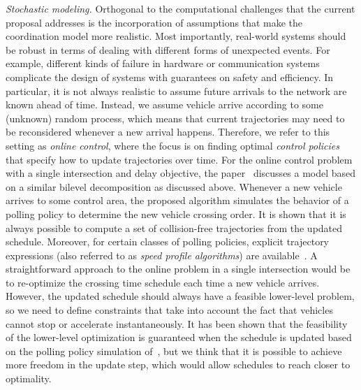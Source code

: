 \documentclass{article}
\theoremstyle{definition}
\theoremstyle{plain}
\begin{document}
\vspace{0.5em}\noindent
\textit{Stochastic modeling.}
Orthogonal to the computational challenges that the current proposal addresses
is the incorporation of assumptions that make the coordination model more
realistic. Most importantly, real-world systems should be robust in terms of
dealing with different forms of unexpected events. For example, different kinds
of failure in hardware or communication systems complicate the design of systems
with guarantees on safety and efficiency.
%
In particular, it is not always realistic to assume future arrivals to the network are known
ahead of time. Instead, we assume vehicle arrive according to some (unknown)
random process, which means that current trajectories may need to be
reconsidered whenever a new arrival happens. Therefore, we refer to this setting
as \textit{online control}, where the focus is on finding optimal \textit{control policies} that
specify how to update trajectories over time.
%
For the online control problem with a single intersection and delay objective,
the paper~\cite{miculescuPollingsystemsbasedAutonomousVehicle2016} discusses a
model based on a similar bilevel decomposition as discussed above. Whenever a
new vehicle arrives to some control area, the proposed algorithm simulates the
behavior of a polling policy to determine the new vehicle crossing order. It is
shown that it is always possible to compute a set of collision-free trajectories
from the updated schedule. Moreover, for certain classes of polling policies,
explicit trajectory expressions (also referred to as \textit{speed profile
  algorithms}) are available~\cite{timmermanPlatoonFormingAlgorithms2021}.
A straightforward approach to the online problem in a single intersection would
be to re-optimize the crossing time schedule each time a new vehicle arrives.
However, the updated schedule should always have a feasible lower-level problem,
so we need to define constraints that take into account the fact that vehicles
cannot stop or accelerate instantaneously. It has been shown that the
feasibility of the lower-level optimization is guaranteed when the schedule is
updated based on the polling policy simulation
of~\cite{miculescuPollingsystemsbasedAutonomousVehicle2016}, but we think that
it is possible to achieve more freedom in the update step, which would allow
schedules to reach closer to optimality.


\newpage


\end{document}
